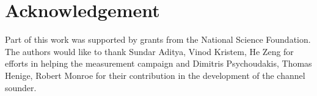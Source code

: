 \documentclass[conference]{IEEEtran}
\begin{document}
\section*{Acknowledgement}
Part of this work was supported by grants from the National Science Foundation. The authors would like to thank Sundar Aditya, Vinod Kristem, He Zeng for efforts in helping the measurement campaign and Dimitris Psychoudakis, Thomas Henige, Robert Monroe for their contribution in the development of the channel sounder.



\end{document}
